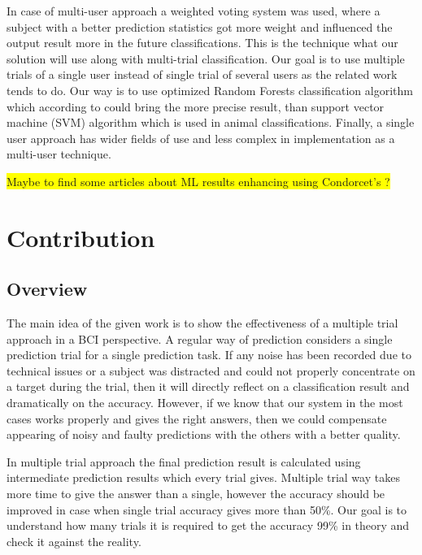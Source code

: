 \documentclass[12pt]{article}
\begin{document}
In case of multi-user approach a weighted voting system was used, where a subject with a better prediction statistics got more weight and influenced the output result more in the future classifications. This is the technique what our solution will use along with multi-trial classification. Our goal is to use multiple trials of a single user instead of single trial of several users as the related work tends to do. Our way is to use optimized Random Forests classification algorithm which according to \cite{masso} could bring the more precise result, than support vector machine (SVM) algorithm which is used in animal classifications. Finally, a single user approach has wider fields of use and less complex in implementation as a multi-user technique.

\colorbox{yellow}{Maybe to find some articles about ML results enhancing using Condorcet's ?}

\newpage
\section{Contribution}

\subsection{Overview}
The main idea of the given work is to show the effectiveness of a multiple trial approach in a BCI perspective. 
A regular way of prediction considers a single prediction trial for a single prediction task. If any noise has been recorded due to technical issues or a subject was distracted and could not properly concentrate on a target during the trial, then it will directly reflect on a classification result and dramatically on the accuracy. However, if we know that our system in the most cases works properly and gives the right answers, then we could compensate appearing of noisy and faulty predictions with the others with a better quality.

In multiple trial approach the final prediction result is calculated using intermediate prediction results which every trial gives. Multiple trial way takes more time to give the answer than a single, however the accuracy should be improved in case when single trial accuracy gives more than 50\%. Our goal is to understand how many trials it is required to get the accuracy 99\% in theory and check it against the reality.
\end{document}
